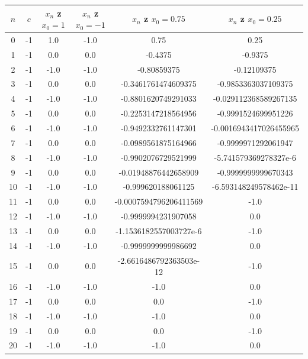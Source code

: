 \documentclass{article}
\begin{document}
\begin{table}[H]
\begin{adjustbox}{center}
\begin{tabular}{|c|c|c|c|c|c|}
    \hline
    $n$ & $c$ & $x_n$ z $x_0 = 1$ & $x_n$ z $x_0 = -1$ & $x_n$ z $x_0 = 0.75$ & $x_n$ z $x_0 = 0.25$\\
    \hline
    0 & -1 & 1.0 & -1.0 & 0.75 & 0.25\\
    \hline
    1 & -1 & 0.0 & 0.0 & -0.4375 & -0.9375\\
    \hline
    2 & -1 & -1.0 & -1.0 & -0.80859375 & -0.12109375\\
    \hline
    3 & -1 & 0.0 & 0.0 & -0.3461761474609375 & -0.9853363037109375\\
    \hline
    4 & -1 & -1.0 & -1.0 & -0.8801620749291033 & -0.029112368589267135\\
    \hline
    5 & -1 & 0.0 & 0.0 & -0.2253147218564956 & -0.9991524699951226\\
    \hline
    6 & -1 & -1.0 & -1.0 & -0.9492332761147301 & -0.0016943417026455965\\
    \hline
    7 & -1 & 0.0 & 0.0 & -0.0989561875164966 & -0.9999971292061947\\
    \hline
    8 & -1 & -1.0 & -1.0 & -0.9902076729521999 & -5.741579369278327e-6\\
    \hline
    9 & -1 & 0.0 & 0.0 & -0.01948876442658909 & -0.9999999999670343\\
    \hline
    10 & -1 & -1.0 & -1.0 & -0.999620188061125 & -6.593148249578462e-11\\
    \hline
    11 & -1 & 0.0 & 0.0 & -0.0007594796206411569 & -1.0\\
    \hline
    12 & -1 & -1.0 & -1.0 & -0.9999994231907058 & 0.0\\
    \hline
    13 & -1 & 0.0 & 0.0 & -1.1536182557003727e-6 & -1.0\\
    \hline
    14 & -1 & -1.0 & -1.0 & -0.9999999999986692 & 0.0\\
    \hline
    15 & -1 & 0.0 & 0.0 & -2.6616486792363503e-12 & -1.0\\
    \hline
    16 & -1 & -1.0 & -1.0 & -1.0 & 0.0\\
    \hline
    17 & -1 & 0.0 & 0.0 & 0.0 & -1.0\\
    \hline
    18 & -1 & -1.0 & -1.0 & -1.0 & 0.0\\
    \hline
    19 & -1 & 0.0 & 0.0 & 0.0 & -1.0\\
    \hline
    20 & -1 & -1.0 & -1.0 & -1.0 & 0.0\\

\end{tabular}
\end{adjustbox}
\end{table}
\end{document}

